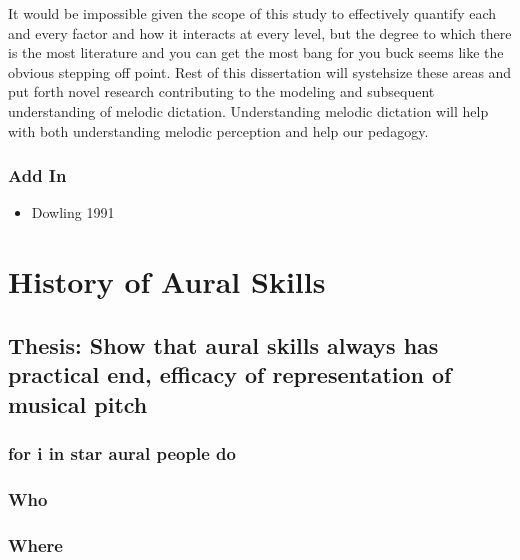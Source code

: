 \documentclass[]{book}
\providecommand{\tightlist}{%
  \setlength{\itemsep}{0pt}\setlength{\parskip}{0pt}}
\theoremstyle{definition}
\theoremstyle{definition}
\theoremstyle{definition}
\theoremstyle{remark}
\begin{document}
It would be impossible given the scope of this study to effectively
quantify each and every factor and how it interacts at every level, but
the degree to which there is the most literature and you can get the
most bang for you buck seems like the obvious stepping off point. Rest
of this dissertation will systehsize these areas and put forth novel
research contributing to the modeling and subsequent understanding of
melodic dictation. Understanding melodic dictation will help with both
understanding melodic perception and help our pedagogy.

\hypertarget{add-in}{%
\subsection{Add In}\label{add-in}}

\begin{itemize}
\tightlist
\item
  Dowling 1991 \citep{dowlingTonalStrengthMelody1991}
\end{itemize}

\hypertarget{history-of-aural-skills}{%
\chapter{History of Aural Skills}\label{history-of-aural-skills}}

\hypertarget{thesis-show-that-aural-skills-always-has-practical-end-efficacy-of-representation-of-musical-pitch}{%
\section{Thesis: Show that aural skills always has practical end,
efficacy of representation of musical
pitch}\label{thesis-show-that-aural-skills-always-has-practical-end-efficacy-of-representation-of-musical-pitch}}

\hypertarget{for-i-in-star-aural-people-do}{%
\subsection{for i in star aural people
do}\label{for-i-in-star-aural-people-do}}

\hypertarget{who}{%
\subsection{Who}\label{who}}

\hypertarget{where}{%
\subsection{Where}\label{where}}
\end{document}
